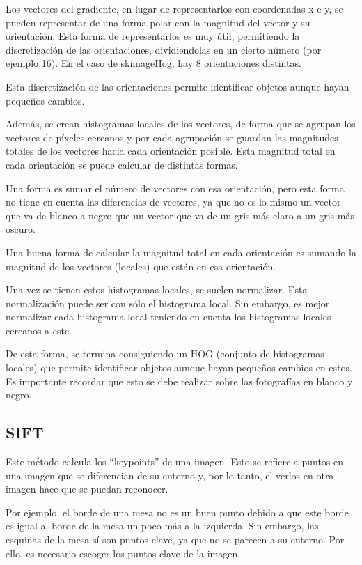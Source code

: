 \documentclass[12pt]{article}
\begin{document}
Los vectores del gradiente, en lugar de representarlos con coordenadas x e y, se pueden representar de una forma polar con la magnitud del vector y su orientación. Esta forma de representarlos es muy útil, permitiendo la discretización de las orientaciones, dividiendolas en un cierto número (por ejemplo 16). En el caso de skimageHog, hay 8 orientaciones distintas.

Esta discretización de las orientaciones permite identificar objetos aunque hayan pequeños cambios.

Además, se crean histogramas locales de los vectores, de forma que se agrupan los vectores de píxeles cercanos y por cada agrupación se guardan las magnitudes totales de los vectores hacia cada orientación posible. Esta magnitud total en cada orientación se puede calcular de distintas formas. 

Una forma es sumar el número de vectores con esa orientación, pero esta forma no tiene en cuenta las diferencias de vectores, ya que no es lo mismo un vector que va de blanco a negro que un vector que va de un gris más claro a un gris más oscuro.

Una buena forma de calcular la magnitud total en cada orientación es sumando la magnitud de los vectores (locales) que están en esa orientación.

Una vez se tienen estos histogramas locales, se suelen normalizar. Esta normalización puede ser con sólo el histograma local. Sin embargo, es mejor normalizar cada histograma local teniendo en cuenta los histogramas locales cercanos a este.

De esta forma, se termina consiguiendo un HOG (conjunto de histogramas locales) que permite identificar objetos aunque hayan pequeños cambios en estos. Es importante recordar que esto se debe realizar sobre las fotografías en blanco y negro.

\subsection*{SIFT}
Este método calcula los ``keypoints'' de una imagen. Esto se refiere a puntos en una imagen que se diferencian de su entorno y, por lo tanto, el verlos en otra imagen hace que se puedan reconocer.

Por ejemplo, el borde de una mesa no es un buen punto debido a que este borde es igual al borde de la mesa un poco más a la izquierda. Sin embargo, las esquinas de la mesa sí son puntos clave, ya que no se parecen a su entorno. Por ello, es necesario escoger los puntos clave de la imagen. 
\end{document}
